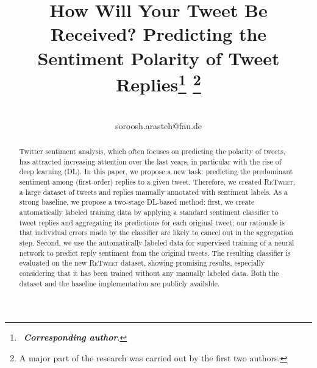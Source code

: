 \documentclass[conference]{IEEEtran}
\newcommand{\retweet}{\textsc{ReTweet}\xspace}
\begin{document}
\title{How Will Your Tweet Be Received? Predicting the Sentiment Polarity of Tweet Replies\thanks{~\textbf{\textit{Corresponding author}}.}
\thanks{A major part of the research was carried out by the first two authors.}}

\author{


\\
soroosh.arasteh@fau.de}




\maketitle



\begin{abstract}
Twitter sentiment analysis, which often focuses on predicting the polarity of tweets, has attracted increasing attention over the last years, in particular with the rise of deep learning (DL).
In this paper, we propose a new task: predicting the predominant sentiment among (first-order) replies to a given tweet. Therefore, we created \retweet, a large dataset of tweets and replies manually annotated with sentiment labels.
As a strong baseline, we propose a two-stage DL-based method:
first, we create automatically labeled training data by applying a standard sentiment classifier to tweet replies and aggregating its predictions for each original tweet; our rationale is that individual errors made by the classifier are likely to cancel out in the aggregation step.
Second, we use the automatically labeled data for supervised training of a neural network to predict reply sentiment from the original tweets. The resulting classifier is evaluated on the new \retweet dataset, showing promising results, especially considering that it has been trained without any manually labeled data.
Both the dataset and the baseline implementation are publicly available.

\end{abstract}
\end{document}
